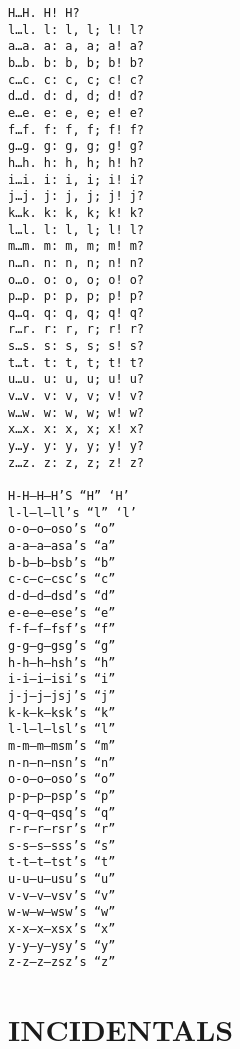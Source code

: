 \documentclass{article}
\begin{document}
\begin{verbatim}
H…H. H! H?
l…l. l: l, l; l! l?
a…a. a: a, a; a! a?
b…b. b: b, b; b! b?
c…c. c: c, c; c! c?
d…d. d: d, d; d! d?
e…e. e: e, e; e! e?
f…f. f: f, f; f! f?
g…g. g: g, g; g! g?
h…h. h: h, h; h! h?
i…i. i: i, i; i! i?
j…j. j: j, j; j! j?
k…k. k: k, k; k! k?
l…l. l: l, l; l! l?
m…m. m: m, m; m! m?
n…n. n: n, n; n! n?
o…o. o: o, o; o! o?
p…p. p: p, p; p! p?
q…q. q: q, q; q! q?
r…r. r: r, r; r! r?
s…s. s: s, s; s! s?
t…t. t: t, t; t! t?
u…u. u: u, u; u! u?
v…v. v: v, v; v! v?
w…w. w: w, w; w! w?
x…x. x: x, x; x! x?
y…y. y: y, y; y! y?
z…z. z: z, z; z! z?

H-H–H—H’S “H” ‘H’
l-l–l—ll’s “l” ‘l’
o-o–o—oso’s “o”
a-a–a—asa’s “a”
b-b–b—bsb’s “b”
c-c–c—csc’s “c”
d-d–d—dsd’s “d”
e-e–e—ese’s “e”
f-f–f—fsf’s “f”
g-g–g—gsg’s “g”
h-h–h—hsh’s “h”
i-i–i—isi’s “i”
j-j–j—jsj’s “j”
k-k–k—ksk’s “k”
l-l–l—lsl’s “l”
m-m–m—msm’s “m”
n-n–n—nsn’s “n”
o-o–o—oso’s “o”
p-p–p—psp’s “p”
q-q–q—qsq’s “q”
r-r–r—rsr’s “r”
s-s–s—sss’s “s”
t-t–t—tst’s “t”
u-u–u—usu’s “u”
v-v–v—vsv’s “v”
w-w–w—wsw’s “w”
x-x–x—xsx’s “x”
y-y–y—ysy’s “y”
z-z–z—zsz’s “z”
\end{verbatim}

\section{INCIDENTALS}
\end{document}

